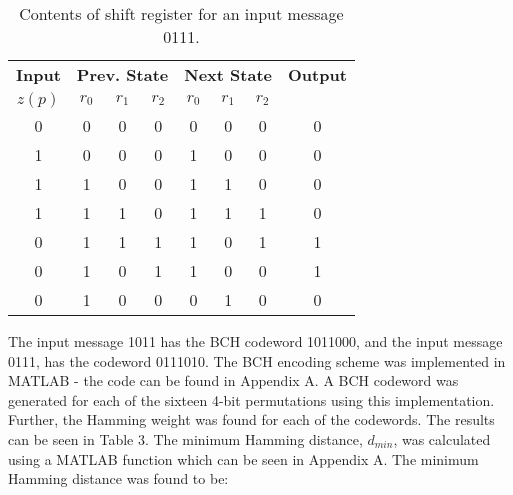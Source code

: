 \documentclass{article}
\begin{document}
\begin{table}[H]
	\centering
	\caption{Contents of shift register for an input message 0111.}
	\begin{tabular}{cccccccc}
		\toprule
		\textbf{Input} & \multicolumn{3}{c}{\textbf{Prev. State}} & \multicolumn{3}{c}{\textbf{Next State}} & \textbf{Output}\\
		$z(p)$ & $r_0$ & $r_1$ & $r_2$ & $r_0$ & $r_1$ & $r_2$ & \\
		\midrule
		0	&	0	&	0	&	0	&	0	&	0	&	0	&	0\\
		1	&	0	&	0	&	0	&	1	&	0	&	0	&	0\\
		1	&	1	&	0	&	0	&	1	&	1	&	0	&	0\\
		1	&	1	&	1	&	0	&	1	&	1	&	1	&	0\\
		0	&	1	&	1	&	1	&	1	&	0	&	1	&	1\\
		0	&	1	&	0	&	1	&	1	&	0	&	0	&	1\\
		0	&	1	&	0	&	0	&	0	&	1	&	0	&	0\\
		\bottomrule
	\end{tabular}
\end{table}

The input message 1011 has the BCH codeword 1011000, and the input message 0111, has the codeword 0111010. The BCH encoding scheme was implemented in MATLAB - the code can be found in Appendix A. A BCH codeword was generated for each of the sixteen 4-bit permutations using this implementation. Further, the Hamming weight was found for each of the codewords. The results can be seen in Table 3. The minimum Hamming distance, $d_{min}$, was calculated using a MATLAB function which can be seen in Appendix A. The minimum Hamming distance was found to be:
\begin{center}
\end{center}
\end{document}
